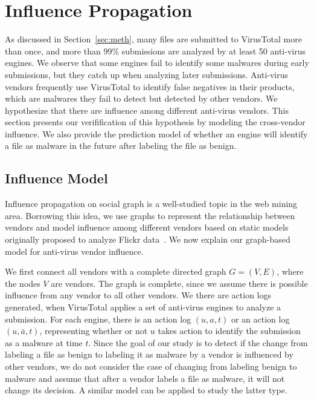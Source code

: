 \section{Influence Propagation}
\label{sec:influ}

As discussed in Section~\ref{sec:meth}, many files are submitted to VirusTotal more than once, 
and more than 99\% submissions are analyzed by at least 50 anti-virus engines. 
We observe that some engines fail to identify some malwares during early submissions, 
but they catch up when analyzing later submissions. 
Anti-virus vendors frequently use VirusTotal to identify false negatives in their products, 
which are malwares they fail to detect but detected by other vendors. 
We hypothesize that there are influence among different anti-virus vendors.
This section presents our verifification of this hypothesis by modeling the cross-vendor influence.
We also provide the prediction model of whether an engine will identify a file as malware in the future
after labeling the file as benign.

\subsection{Influence Model}
\label{sec:model}
Influence propagation on social graph is a well-studied topic in the web mining area. 
Borrowing this idea, we use graphs to represent the relationship between vendors 
and model influence among different vendors based on static models 
originally proposed to analyze Flickr data~\cite{Influence}.
We now explain our graph-based model for anti-virus vendor influence.

We first connect all vendors with a complete directed graph $G = (V, E)$, 
where the nodes $V$ are vendors. 
The graph is complete, 
since we assume there is possible influence from any vendor to all other vendors.
We  there are action logs generated, 
when VirusTotal applies a set of anti-virus engines to analyze a submission. 
For each engine, there is an action log $(u, a, t)$ or an action log $(u, \bar{a}, t)$, 
representing whether or not $u$ takes action to identify the submission as a malware at time $t$. 
Since the goal of our study is to detect if the change from labeling a file as benign to labeling it as malware by a vendor is influenced by other vendors, 
we do not consider the case of changing from labeling benign to malware and assume that after a vendor labels a file as malware, it will not change its decision.
A similar model can be applied to study the latter type.

